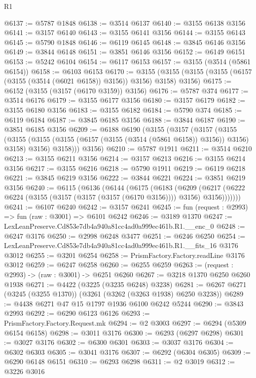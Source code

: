 \begin{lexlean}{R1}
\begin{coremodule}
@6137 := @5787 @1848
@6138 := @3514 @6137
@6140 := @3155 @6138 @3156
@6141 := @3157 @6140
@6143 := @3155 @6141 @3156
@6144 := @3155 @6143
@6145 := @5790 @1848
@6146 := @6119 @6145
@6148 := @3845 @6146 @3156
@6149 := @3844 @6148
@6151 := @3851 @6146 @3156
@6152 := @6149 @6151
@6153 := @5242 @6104
@6154 := @6117 @6153
@6157 := @3155 (@3514 (@5861 @6154))
@6158 := @6103 @6153
@6170 := @3155 (@3155 (@3155 (@3155 (@6157 (@3155 (@3514 (@6021 @6158)) @3156)) @3156) @3158) @3156)
@6175 := @6152 (@3155 (@3157 (@6170 @3159)) @3156)
@6176 := @5787 @374
@6177 := @3514 @6176
@6179 := @3155 @6177 @3156
@6180 := @3157 @6179
@6182 := @3155 @6180 @3156
@6183 := @3155 @6182
@6184 := @5790 @374
@6185 := @6119 @6184
@6187 := @3845 @6185 @3156
@6188 := @3844 @6187
@6190 := @3851 @6185 @3156
@6209 := @6188
    @6190
    (@3155
      (@3157
        (@3157
          (@3155
            (@3155 (@3155 (@3155 (@6157 (@3155 (@3514 (@5861 @6158)) @3156)) @3156) @3158) @3156)
            @3158)))
      @3156)
@6210 := @5787 @1911
@6211 := @3514 @6210
@6213 := @3155 @6211 @3156
@6214 := @3157 @6213
@6216 := @3155 @6214 @3156
@6217 := @3155 @6216
@6218 := @5790 @1911
@6219 := @6119 @6218
@6221 := @3845 @6219 @3156
@6222 := @3844 @6221
@6224 := @3851 @6219 @3156
@6240 := @6115
    (@6136
      (@6144
        (@6175
          (@6183
            (@6209
              (@6217 (@6222 @6224 (@3155 (@3157 (@3157 (@3157 (@6170 @3156)))) @3156) @3156)))))))
@6241 := @6107 @6240
@6242 := @3157 @6241
@6245 := fun (request : @2993) => fun (raw : @3001) => @6101 @6242
@6246 := @3189 @1370
@6247 := LexLeanPreserve.Cd853e7db4a940a81cc4ad0a999ec461b.R1.__enc_0
@6248 := @6247 @3176
@6250 := @2998 @6248 @3477
@6251 := @6246 @6250
@6254 := LexLeanPreserve.Cd853e7db4a940a81cc4ad0a999ec461b.R1.__fits_16 @3176 @3012
@6255 := @3201 @6254
@6258 := PrismFactory.Factory.readLine @3176 @3012
@6259 := @6247 @6258
@6260 := @6255 @6259
@6263 := (request : @2993) -> (raw : @3001) -> @6251 @6260
@6267 := @3218 @1370 @6250 @6260 @1938
@6271 := @4422 (@3225 (@3235 @6248) @3238)
@6281 := @6267 @6271 (@3245 (@3255 @1370)) (@3261 (@3262 (@3263 @1938) @6250 @3238))
@6289 := @4438 @6271 @47 @15 @1797 @1936 @6100 @6242 @5244
@6290 := @3843 @2993
@6292 := @6290 @6123 @6126
@6293 := PrismFactory.Factory.Request.mk
@6294 := @2 @3003
@6297 := @6294 (@5309 @6154 @6158)
@6298 := @3011 @3176
@6300 := @6293 (@6297 @6298)
@6301 := @3027 @3176
@6302 := @6300 @6301
@6303 := @3037 @3176
@6304 := @6302 @6303
@6305 := @3041 @3176
@6307 := @6292 (@6304 @6305)
@6309 := @6290 @6148 @6151
@6310 := @6293 @6298
@6311 := @2 @3019
@6312 := @3226 @3016

\end{coremodule}
\end{lexlean}
